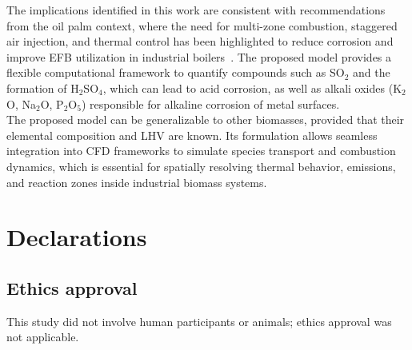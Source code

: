 \documentclass[preprint,12pt]{elsarticle}
\begin{document}

The implications identified in this work are consistent with recommendations from the oil palm context, where the need for multi-zone combustion, staggered air injection, and thermal control has been highlighted to reduce corrosion and improve EFB utilization in industrial boilers~\cite{BayonaRaquis}. The proposed model provides a flexible computational framework to quantify compounds such as SO$_2$ and the formation of H$_2$SO$_4$, which can lead to acid corrosion, as well as alkali oxides (K$_2$O, Na$_2$O, P$_2$O$_5$) responsible for alkaline corrosion of metal surfaces.\\

The proposed model can be generalizable to other biomasses, provided that their elemental composition and LHV are known. Its formulation allows seamless integration into CFD frameworks to simulate species transport and combustion dynamics, which is essential for spatially resolving thermal behavior, emissions, and reaction zones inside industrial biomass systems.\\

\section{Declarations}

\subsection{Ethics approval}
This study did not involve human participants or animals; ethics approval was not applicable.
\end{document}
